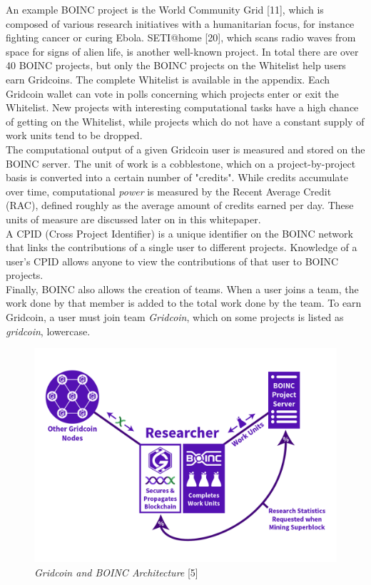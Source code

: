 An example BOINC project is the World Community Grid [11], which is composed of various research initiatives with a humanitarian focus, for instance fighting cancer or curing Ebola. SETI@home [20], which scans radio waves from space for signs of alien life, is another well-known project.  In total there are over 40 BOINC projects, but only the BOINC projects on the Whitelist help users earn Gridcoins. The complete Whitelist is available in the appendix. Each Gridcoin wallet can vote in polls concerning which projects enter or exit the Whitelist. New projects with interesting computational tasks have a high chance of getting on the Whitelist, while projects which do not have a constant supply of work units tend to be dropped. \\

The computational output of a given Gridcoin user is measured and stored on the BOINC server. The unit of work is a cobblestone, which on a project-by-project basis is converted into a certain number of "credits".  While credits accumulate over time, computational \textit{power} is measured by the Recent Average Credit (RAC), defined roughly as the average amount of credits earned per day. These units of measure are discussed later on in this whitepaper.\\

A CPID (Cross Project Identifier) is a unique identifier on the BOINC network that links the contributions of a single user to different projects. Knowledge of a user's CPID allows anyone to view the contributions of that user to BOINC projects.\\

Finally, BOINC also allows the creation of teams. When a user joins a team, the work done by that member is added to the total work done by the team. To earn Gridcoin, a user must join team \textit{Gridcoin}, which on some projects is listed as \textit{gridcoin}, lowercase.

\begin{figure}
\centering
\includegraphics[scale=0.5]{figures/researcherdiagram_joshoeah}
\medskip
\caption{\textit{Gridcoin and BOINC Architecture} [5]}
\small
\end{figure}

